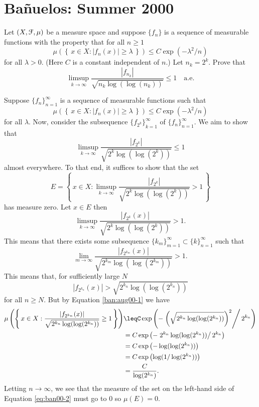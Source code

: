 \section{Bañuelos: Summer 2000}
\setcounter{exercise}{0}
\setcounter{equation}{0}
\begin{problem}
  Let $(X,\mathcal{F},\mu)$ be a measure space and suppose $\{f_n\}$ is a
  sequence of measurable functions with the property that for all
  $n\geq 1$
  \[
    \mu\left(\left\{\,x\in X:|f_n(x)|\geq\lambda\,\right\}\right)\leq C
    \exp(-\lambda^2/n)
  \]
  for all $\lambda>0$. (Here $C$ is a constant independent of $n$.) Let
  $n_k=2^k$. Prove that
  \[
    \limsup_{k\to\infty}\frac{|f_{n_k}|}{\sqrt{n_k\log(\log(n_k))}}\leq
    1\quad\text{a.e.}
  \]
\end{problem}
\begin{solution}
  Suppose ${\{f_n\}}_{n=1}^\infty$ is a sequence of measurable functions
  such that
  \begin{equation}
    \label{ban:aug00-1}%
    \mu\left(\left\{\,x\in X:|f_n(x)|\geq\lambda\,\right\}\right)\leq C
    \exp(-\lambda^2/n)
  \end{equation}
    for all $\lambda$. Now, consider the subsequence
  ${\{f_{2^k}\}}_{k=1}^\infty$ of ${\{f_n\}}_{n=1}^\infty$. We aim to show
  that
  \[
    \limsup_{k\to\infty}\frac{|f_{2^k}|}{\sqrt{2^k\log(\log(2^k))}}\leq 1
  \]
  almost everywhere. To that end, it suffices to show that the set
  \[
    E=%
    \left\{\,%
      x\in
      X:\limsup_{k\to\infty}\frac{|f_{2^k}|}{\sqrt{2^k\log(\log(2^k))}}>1%
      \,%
    \right\}
  \]
  has measure zero. Let $x\in E$ then
  \[
    \limsup_{k\to\infty} \frac{|f_{2^k}(x)|}{\sqrt{2^k\log(\log(2^k))}}>1.
  \]
  This means that there exists some subsequence
  $\{k_m\}_{m=1}^\infty\subset\{k\}_{n=1}^\infty$ such that
  \[
    \lim_{m\to\infty}\frac{|f_{2^{k_m}}(x)|}{\sqrt{2^{k_m}\log(\log(2^{k_m}))}}>1.
  \]
  This means that, for sufficiently large $N$
  \[
    |f_{2^{k_n}}(x)|>\sqrt{2^{k_n}\log(\log(2^{k_n}))}
  \]
  for all $n\geq N$. But by Equation \eqref{ban:aug00-1} we have
  \begin{equation}
    \label{eq:ban00-2}
    \begin{aligned}
      \mu\left(\left\{\,%
          x\in
          X:\frac{|f_{2^{k_n}}(x)|}{\sqrt{2^{k_n}\log(\log(2^{k_n}))}}\geq
          1 \,\right\}\right) &\leq%
      C\exp\left(-\left.
          \left(\sqrt{2^{k_n}\log(\log(2^{k_n}))}\right)^2\right/2^{k_n}%
      \right)\\
      &=C\exp\left(-\left.2^{k_n}\log(\log(2^{k_n}))\right/2^{k_n} \right)\\
      &=C\exp\left(-\log(\log(2^{k_n}))\right)\\
      &=C\exp\left(\log(1/\log(2^{k_n}))\right)\\
      &=\frac{C}{\log(2^{k_n})}.
    \end{aligned}
  \end{equation}
  Letting $n\to\infty$, we see that the measure of the set on the left-hand
  side of Equation \eqref{eq:ban00-2} must go to $0$ so $\mu(E)=0$.
\end{solution}

